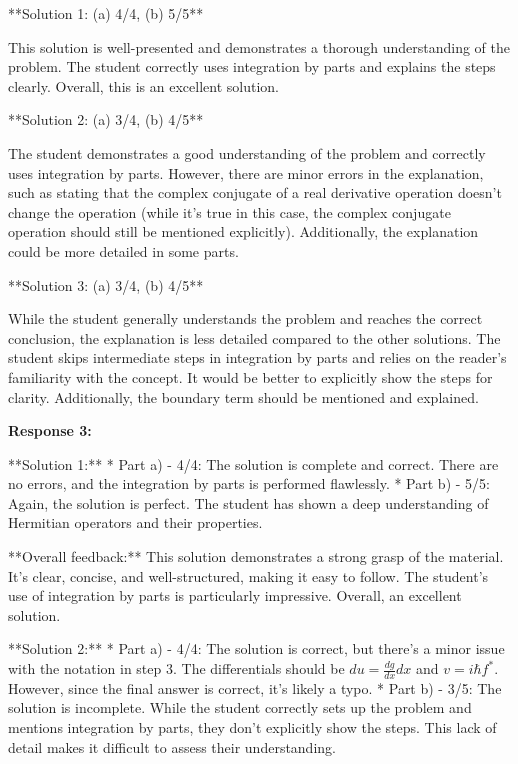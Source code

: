 \documentclass[a4paper,11pt]{article}
\begin{document}
**Solution 1: (a) 4/4, (b) 5/5**

This solution is well-presented and demonstrates a thorough understanding of the problem. The student correctly uses integration by parts and explains the steps clearly. Overall, this is an excellent solution.

**Solution 2: (a) 3/4, (b) 4/5**

The student demonstrates a good understanding of the problem and correctly uses integration by parts. However, there are minor errors in the explanation, such as stating that the complex conjugate of a real derivative operation doesn't change the operation (while it's true in this case, the complex conjugate operation should still be mentioned explicitly). Additionally, the explanation could be more detailed in some parts.

**Solution 3: (a) 3/4, (b) 4/5**

While the student generally understands the problem and reaches the correct conclusion, the explanation is less detailed compared to the other solutions. The student skips intermediate steps in integration by parts and relies on the reader's familiarity with the concept. It would be better to explicitly show the steps for clarity. Additionally, the boundary term should be mentioned and explained.

\bigskip    
\textbf{Response 3:}

**Solution 1:**
*   Part a) - 4/4: The solution is complete and correct. There are no errors, and the integration by parts is performed flawlessly.
*   Part b) - 5/5: Again, the solution is perfect. The student has shown a deep understanding of Hermitian operators and their properties. 

**Overall feedback:** This solution demonstrates a strong grasp of the material. It's clear, concise, and well-structured, making it easy to follow. The student's use of integration by parts is particularly impressive. Overall, an excellent solution. 

**Solution 2:**
*   Part a) - 4/4: The solution is correct, but there's a minor issue with the notation in step 3. The differentials should be \( du = \frac{dg}{dx} dx \) and \( v = i\hbar f^{*} \). However, since the final answer is correct, it's likely a typo. 
*   Part b) - 3/5: The solution is incomplete. While the student correctly sets up the problem and mentions integration by parts, they don't explicitly show the steps. This lack of detail makes it difficult to assess their understanding. 
\end{document}
